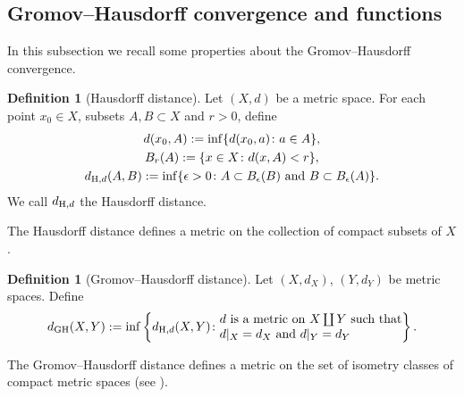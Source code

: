 \documentclass[pdftex]{sigma}
\numberwithin{equation}{section}
\theoremstyle{definition}
\newtheorem{Def}[Thm]{Definition}
\begin{document}
\subsection{Gromov--Hausdorff convergence and functions}
In this subsection we recall some properties about the Gromov--Hausdorff convergence.
\begin{Def}[Hausdorff distance]\label{Dhau}
Let $(X,d)$ be a metric space.
For each point $x_0\in X$, subsets $A,B\subset X$ and $r>0$, define
\begin{gather*}
d(x_0,A):=\inf\{d(x_0,a)\colon a\in A\},
\\
B_{r}(A):=\{x\in X\colon d(x,A)<r\},
\\
d_{{\rm H},d}(A,B):=\inf\{\epsilon>0\colon A\subset B_{\epsilon}(B) \text{ and } B\subset B_{\epsilon}(A)\}.
\end{gather*}
We call $d_{{\rm H},d}$ the Hausdorff distance.
\end{Def}
The Hausdorff distance defines a metric on the collection of compact subsets of $X$.
\begin{Def}[Gromov--Hausdorff distance]\label{DGH}
Let $(X,d_X)$, $(Y,d_Y)$ be metric spaces.
Define
\[
d_{{\rm GH}}(X,Y):=\inf\left\{d_{{\rm H},d}(X,Y)\colon \begin{array}{@{}l@{}}\text{$d$ is a metric on $X\coprod Y$ such that}\\
\text{$d|_X=d_X$ and $d|_Y=d_Y$}
\end{array}\right\} .
\]
\end{Def}
The Gromov--Hausdorff distance defines a metric on the set of isometry classes of compact metric spaces (see \cite[Proposition~11.1.3]{Pe3}).
\end{document}
